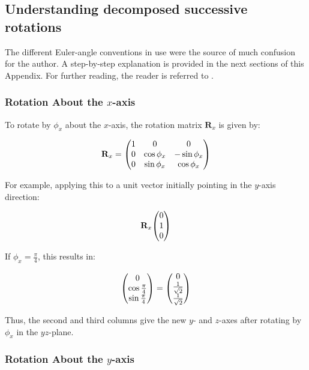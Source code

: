 \documentclass{article}
\begin{document}
\subsection{Understanding decomposed successive rotations}

The different Euler-angle conventions in use were the source of much confusion for the author. A step-by-step explanation is provided in the next sections of this Appendix. For further reading, the reader is referred to \cite{kaneSpacecraftDynamics1983, valleryAdvancedDynamics2019}.

\subsubsection*{Rotation About the \( x \)-axis}

To rotate by \( \phi_x \) about the \( x \)-axis, the rotation matrix \( \mathbf{R}_x \) is given by:

\begin{equation}
\mathbf{R}_x = \mqty(
1 & 0 & 0 \\
0 & \cos \phi_x & -\sin \phi_x \\
0 & \sin \phi_x & \cos \phi_x
)
\end{equation}

For example, applying this to a unit vector initially pointing in the \( y \)-axis direction:

\begin{equation}
\mathbf{R}_x \mqty( 0 \\ 1 \\ 0 )
\end{equation}

If \( \phi_x = \frac{\pi}{4} \), this results in:

\begin{equation}
\mqty( 0 \\ \cos \frac{\pi}{4} \\ \sin \frac{\pi}{4} ) = \mqty( 0 \\ \frac{1}{\sqrt{2}} \\ \frac{1}{\sqrt{2}} )
\end{equation}

Thus, the second and third columns give the new \( y \)- and \( z \)-axes after rotating by \( \phi_x \) in the \( yz \)-plane.

\subsubsection*{Rotation About the \( y \)-axis}
\end{document}
